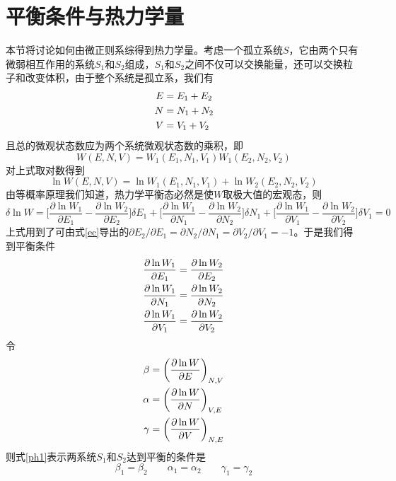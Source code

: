 \documentclass[UTF8,oneside,openany]{ctexbook}
\begin{document}
\section{平衡条件与热力学量}
本节将讨论如何由微正则系综得到热力学量。考虑一个孤立系统$S$，它由两个只有微弱相互作用的系统$S_1$和$S_2$组成，$S_1$和$S_2$之间不仅可以交换能量，还可以交换粒子和改变体积，由于整个系统是孤立系，我们有
\begin{align}\label{ec}
E&=E_1+E_2\notag\\
N&=N_1+N_2\notag\\
V&=V_1+V_2
\end{align}
且总的微观状态数应为两个系统微观状态数的乘积，即
\begin{equation}
W(E,N,V)=W_1(E_1,N_1,V_1)W_1(E_2,N_2,V_2)
\end{equation}
对上式取对数得到
\begin{equation}
\ln W(E,N,V)=\ln W_1(E_1,N_1,V_1)+\ln W_2(E_2,N_2,V_2)
\end{equation}
由等概率原理我们知道，热力学平衡态必然是使$W$取极大值的宏观态，则
\begin{equation}
\delta\ln W=\biggl[\frac{\partial\ln W_1}{\partial E_1}-\frac{\partial\ln W_2}{\partial E_2}\biggr]\delta E_1+\biggl[\frac{\partial\ln W_1}{\partial N_1}-\frac{\partial\ln W_2}{\partial N_2}\biggr]\delta N_1+\biggl[\frac{\partial\ln W_1}{\partial V_1}-\frac{\partial\ln W_2}{\partial V_2}\biggr]\delta V_1=0
\end{equation}
上式用到了可由式\ref{ec}导出的$\partial E_2/\partial E_1=\partial N_2/\partial N_1=\partial V_2/\partial V_1=-1$。于是我们得到平衡条件
\begin{align}\label{ph1}
\frac{\partial\ln W_1}{\partial E_1}&=\frac{\partial\ln W_2}{\partial E_2}\notag\\
\frac{\partial\ln W_1}{\partial N_1}&=\frac{\partial\ln W_2}{\partial N_2}\notag\\
\frac{\partial\ln W_1}{\partial V_1}&=\frac{\partial\ln W_2}{\partial V_2}
\end{align}
令
\begin{align}\label{beta}
\beta&=\biggl(\frac{\partial\ln W}{\partial E}\biggr)_{N,V}\notag\\
\alpha&=\biggl(\frac{\partial\ln W}{\partial N}\biggr)_{V,E}\notag\\
\gamma&=\biggl(\frac{\partial\ln W}{\partial V}\biggr)_{N,E}
\end{align}
则式\ref{ph1}表示两系统$S_1$和$S_2$达到平衡的条件是
\begin{equation}\label{ph}
\beta_1=\beta_2\qquad\alpha_1=\alpha_2\qquad\gamma_1=\gamma_2
\end{equation}
\end{document}
